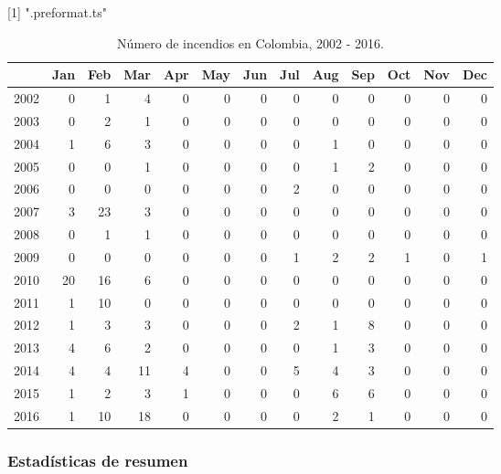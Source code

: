 \documentclass[a4paper]{article}\usepackage[]{graphicx}\usepackage[]{color}
\begin{document}
[1] ".preformat.ts"
\begin{table}[ht]
\centering
\begin{tabular}{rrrrrrrrrrrrr}
  \hline
 & Jan & Feb & Mar & Apr & May & Jun & Jul & Aug & Sep & Oct & Nov & Dec \\ 
  \hline
2002 &   0 &   1 &   4 &   0 &   0 &   0 &   0 &   0 &   0 &   0 &   0 &   0 \\ 
  2003 &   0 &   2 &   1 &   0 &   0 &   0 &   0 &   0 &   0 &   0 &   0 &   0 \\ 
  2004 &   1 &   6 &   3 &   0 &   0 &   0 &   0 &   1 &   0 &   0 &   0 &   0 \\ 
  2005 &   0 &   0 &   1 &   0 &   0 &   0 &   0 &   1 &   2 &   0 &   0 &   0 \\ 
  2006 &   0 &   0 &   0 &   0 &   0 &   0 &   2 &   0 &   0 &   0 &   0 &   0 \\ 
  2007 &   3 &  23 &   3 &   0 &   0 &   0 &   0 &   0 &   0 &   0 &   0 &   0 \\ 
  2008 &   0 &   1 &   1 &   0 &   0 &   0 &   0 &   0 &   0 &   0 &   0 &   0 \\ 
  2009 &   0 &   0 &   0 &   0 &   0 &   0 &   1 &   2 &   2 &   1 &   0 &   1 \\ 
  2010 &  20 &  16 &   6 &   0 &   0 &   0 &   0 &   0 &   0 &   0 &   0 &   0 \\ 
  2011 &   1 &  10 &   0 &   0 &   0 &   0 &   0 &   0 &   0 &   0 &   0 &   0 \\ 
  2012 &   1 &   3 &   3 &   0 &   0 &   0 &   2 &   1 &   8 &   0 &   0 &   0 \\ 
  2013 &   4 &   6 &   2 &   0 &   0 &   0 &   0 &   1 &   3 &   0 &   0 &   0 \\ 
  2014 &   4 &   4 &  11 &   4 &   0 &   0 &   5 &   4 &   3 &   0 &   0 &   0 \\ 
  2015 &   1 &   2 &   3 &   1 &   0 &   0 &   0 &   6 &   6 &   0 &   0 &   0 \\ 
  2016 &   1 &  10 &  18 &   0 &   0 &   0 &   0 &   2 &   1 &   0 &   0 &   0 \\ 
   \hline
\end{tabular}
\caption{Número de incendios en Colombia, 2002 - 2016.} 
\end{table}


\subsubsection*{Estadísticas de resumen}
\end{document}
